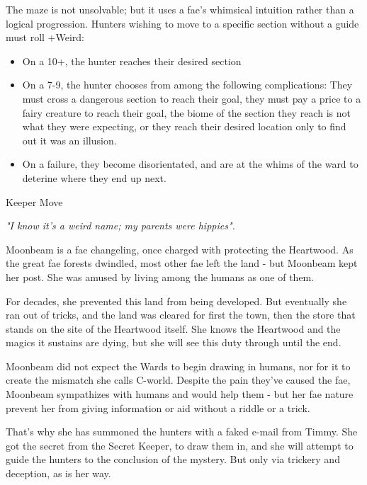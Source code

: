 \documentclass{motw}
\begin{document}
The maze is not unsolvable; but it uses a fae's whimsical intuition rather than a logical progression.  Hunters wishing to move to a specific section without a guide must roll +Weird:
\begin{itemize}
    \item On a 10+, the hunter reaches their desired section
    \item On a 7-9, the hunter chooses from among the following complications: They  must cross a dangerous section to reach their goal, they must pay a price to a fairy creature to reach their goal, the biome of the section they reach is not what they were expecting, or they reach their desired location only to find out it was an illusion.
    \item On a failure, they become disorientated, and are at the whims of the ward to deterine where they end up next.
\end{itemize}

\begin{mStatBlock}{Keeper Move}
\end{mStatBlock}


\emph{"I know it's a weird name; my parents were hippies".}

Moonbeam is a fae changeling, once charged with protecting the Heartwood.  As the great fae forests dwindled, most other fae left the land - but Moonbeam kept her post.  She was amused by living among the humans as one of them.

For decades, she prevented this land from being developed.  But eventually she ran out of tricks, and the land was cleared for first the town, then the store that stands on the site of the Heartwood itself.  She knows the Heartwood and the magics it sustains are dying, but she will see this duty through until the end.

Moonbeam did not expect the Wards to begin drawing in humans, nor for it to create the mismatch she calls C-world.  Despite the pain they've caused the fae, Moonbeam sympathizes with humans and would help them - but her fae nature prevent her from giving information or aid without a riddle or a trick.

That's why she has summoned the hunters with a faked e-mail from Timmy.  She got the secret from the Secret Keeper, to draw them in, and she will attempt to guide the hunters to the conclusion of the mystery. But only via trickery and deception, as is her way.
\end{document}
